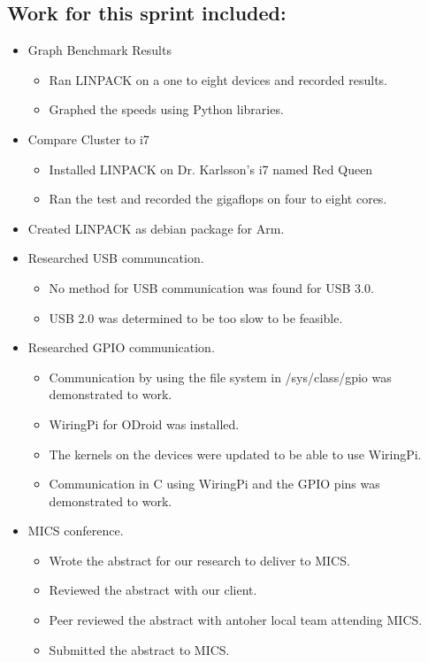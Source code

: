 \documentclass{article}
\begin{document}
\subsection*{Work for this sprint included:}
\begin{itemize}
	\item Graph Benchmark Results
	\begin{itemize}
		\item Ran LINPACK on a one to eight devices and recorded results.
		\item Graphed the speeds using Python libraries.
	\end{itemize}
	\item Compare Cluster to i7
	\begin{itemize}
		\item Installed LINPACK on Dr. Karlsson's i7 named Red Queen
		\item Ran the test and recorded the gigaflops on four to eight cores.
	\end{itemize}
	\item Created LINPACK as debian package for Arm.
	\item Researched USB communcation.
	\begin{itemize}
		\item No method for USB communication was found for USB 3.0.
		\item USB 2.0 was determined to be too slow to be feasible.
	\end{itemize}
	\item Researched GPIO communication.
	\begin{itemize}
		\item Communication by using the file system in /sys/class/gpio was demonstrated to work.
		\item WiringPi for ODroid was installed.
		\item The kernels on the devices were updated to be able to use WiringPi.
		\item Communication in C using WiringPi and the GPIO pins was demonstrated to work.
	\end{itemize} 
	\item MICS conference.
	\begin{itemize}
		\item Wrote the abstract for our research to deliver to MICS.
		\item Reviewed the abstract with our client.
		\item Peer reviewed the abstract with antoher local team attending MICS.
		\item Submitted the abstract to MICS.
	\end{itemize}
\end{itemize}
\end{document}
